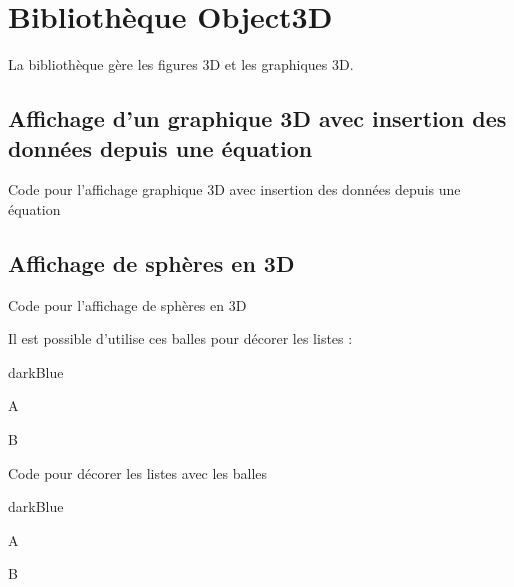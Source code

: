 \chapter{Bibliothèque Object3D}

La bibliothèque  gère les figures 3D et les graphiques 3D.

\section{Affichage d'un graphique 3D avec insertion des données depuis une équation}



\begin{Latex}{Code pour l'affichage graphique 3D avec insertion des données depuis une équation}
\end{Latex}

\section{Affichage de sphères en 3D}


\begin{Latex}{Code pour l'affichage de sphères en 3D}
\end{Latex}

Il est possible d'utilise ces balles pour décorer les listes : \\

\begin{items}{darkBlue}{}
    \item A
    \item B
    \end{items}

\begin{Latex}{Code pour décorer les listes avec les balles}
\begin{items}{darkBlue}{}
\item A
\item B
\end{items}
\end{Latex}


